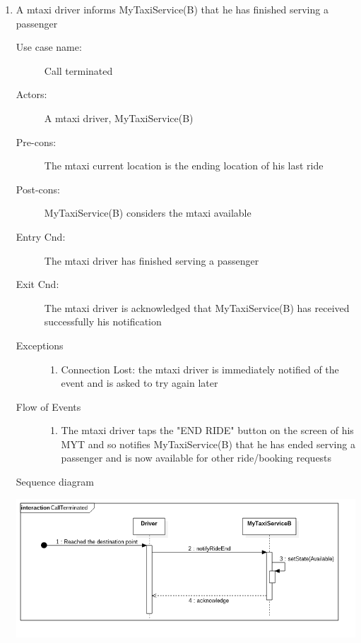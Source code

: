 \documentclass[11pt]{article} %
\begin{document}
\begin{enumerate}
	
	       \item A mtaxi driver informs MyTaxiService(B) that he has finished serving a passenger
		\begin{description}
		        \item [Use case name:] Call terminated
		        \item [Actors:] A mtaxi driver, MyTaxiService(B)
		        \item [Pre-cons:] The mtaxi current location is the ending location of his last ride
		        \item [Post-cons:] MyTaxiService(B) considers the mtaxi available
		        \item [Entry Cnd:] The mtaxi driver has finished serving a passenger
		        \item [Exit Cnd:] The mtaxi driver is acknowledged that MyTaxiService(B) has received successfully his
		        notification
		        \item [Exceptions]\hfill
			\begin{enumerate}
			          \item Connection Lost: the mtaxi driver is immediately notified of the event and is asked to try again
			          later
			\end{enumerate}
		        \item [Flow of Events]\hfill
			\begin{enumerate}
			          \item The mtaxi driver taps the "END RIDE" button on the screen of his MYT and so notifies MyTaxiService(B) that
			          he has ended serving a passenger and is now available for other ride/booking requests
			\end{enumerate}
		\end{description}
		Sequence diagram
		\begin{center}
		\includegraphics[scale=0.52]{usecase4.png}
		\end{center}
	

\end{enumerate}
\end{document}
